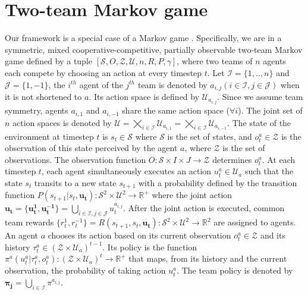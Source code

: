 \section{Two-team Markov game}
Our framework is a special case of a Markov game \citep{MarkovGames}.
Specifically, we are in a symmetric, mixed cooperative-competitive, partially observable two-team Markov game defined by a tuple $[\mathcal{S}, O, \mathcal{Z}, \mathcal{U}, n, R, P, \gamma]$, where two teams of $n$ agents each compete by choosing an action at every timestep $t$.
Let $\mathcal{I}=\{1,..,n\}$ and $\mathcal{J}=\{1,-1\}$, the $i^{th}$ agent of the $j^{th}$ team is denoted by $a_{i, j} (i \in \mathcal{I}, j \in \mathcal{J})$ when it is not shortened to $a$.
Its action space is defined by $\mathcal{U}_{a_{i, j}}$.
Since we assume team symmetry, agents $a_{i, 1}$ and $a_{i, -1}$ share the same action space ($\forall i$).
The joint set of $n$ action spaces is denoted by $\mathcal{U}=\bigtimes_{i\in \mathcal{I}} \mathcal{U}_{{a_{i, 1}}} = \bigtimes_{i\in \mathcal{I}} 
\mathcal{U}_{{a_{i, -1}}}$.
The state of the environment at timestep $t$ is $s_t \in \mathcal{S}$ where $\mathcal{S}$ is the set of states, and $o_t^{a} \in \mathcal{Z}$ is the observation of this state perceived by the agent $a$, where $\mathcal{Z}$ is the set of observations. The observation function $O: \mathcal{S} \times I \times J \rightarrow \mathcal{Z}$ determines $o_t^a$.
At each timestep $t$, each agent simultaneously executes an action $u_t^{a} \in \mathcal{U}_a$ such that the state $s_t$ transits to a new state $s_{t+1}$ with a probability defined by the transition function $P(s_{t+1}|s_t, \mathbf{u_t}): \mathcal{S}^2 \times \mathcal{U}^2 \rightarrow \mathbb{R^+}$ where the joint action $\mathbf{u_t} = \{\mathbf{u^1_t}, \mathbf{u^{-1}_t}\} = \bigcup_{i \in \mathcal{I}, j \in \mathcal{J}} u_t^{a_{i, j}}$. 
After the joint action is executed, common team rewards $\{r_t^1, r_t^{-1}\} = R(s_{t+1}, s_t, \mathbf{u_t}): \mathcal{S}^2 \times \mathcal{U}^2 \rightarrow \mathbb{R}^2$ are assigned to agents.
An agent $a$ chooses its action based on its current observation $o_t^{a} \in \mathcal{Z}$ and its history $\tau_t^{a} \in (\mathcal{Z} \times \mathcal{U}_a)^{t-1}$.
Its policy is the function $\pi^{a}(u_t^{a}|\tau_t^{a},o_t^{a}): (\mathcal{Z} \times \mathcal{U}_a)^t \rightarrow \mathbb{R^+}$ that maps, from its history and the current observation, the probability of taking action $u_t^{a}$.
The team policy is denoted by $\mathbf{\pi_j}=\bigcup_{i \in \mathcal{I}} \pi^{a_{i, j}}$.

